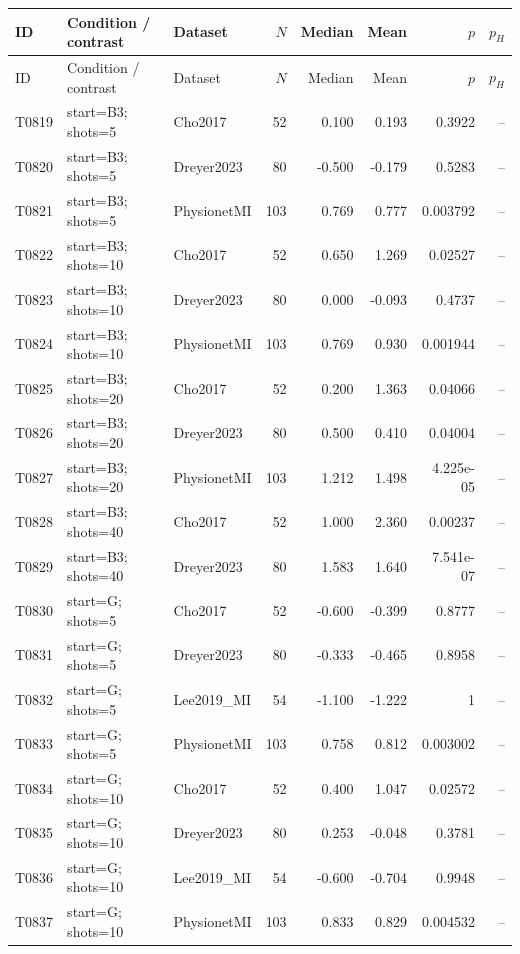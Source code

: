 \begin{longtable}{p{.45in}p{2.6in}p{.75in}rrrrr}
\toprule
ID & Condition / contrast & Dataset & $N$ & Median & Mean & $p$ & $p_H$ \\
\midrule
\endfirsthead
\toprule
ID & Condition / contrast & Dataset & $N$ & Median & Mean & $p$ & $p_H$ \\
\midrule
\endhead
T0819 & start=B3; shots=5 & Cho2017 & 52 & 0.100 & 0.193 & 0.3922 & -- \\
T0820 & start=B3; shots=5 & Dreyer2023 & 80 & -0.500 & -0.179 & 0.5283 & -- \\
T0821 & start=B3; shots=5 & PhysionetMI & 103 & 0.769 & 0.777 & 0.003792 & -- \\
T0822 & start=B3; shots=10 & Cho2017 & 52 & 0.650 & 1.269 & 0.02527 & -- \\
T0823 & start=B3; shots=10 & Dreyer2023 & 80 & 0.000 & -0.093 & 0.4737 & -- \\
T0824 & start=B3; shots=10 & PhysionetMI & 103 & 0.769 & 0.930 & 0.001944 & -- \\
T0825 & start=B3; shots=20 & Cho2017 & 52 & 0.200 & 1.363 & 0.04066 & -- \\
T0826 & start=B3; shots=20 & Dreyer2023 & 80 & 0.500 & 0.410 & 0.04004 & -- \\
T0827 & start=B3; shots=20 & PhysionetMI & 103 & 1.212 & 1.498 & 4.225e-05 & -- \\
T0828 & start=B3; shots=40 & Cho2017 & 52 & 1.000 & 2.360 & 0.00237 & -- \\
T0829 & start=B3; shots=40 & Dreyer2023 & 80 & 1.583 & 1.640 & 7.541e-07 & -- \\
T0830 & start=G; shots=5 & Cho2017 & 52 & -0.600 & -0.399 & 0.8777 & -- \\
T0831 & start=G; shots=5 & Dreyer2023 & 80 & -0.333 & -0.465 & 0.8958 & -- \\
T0832 & start=G; shots=5 & Lee2019\_\allowbreak{}MI & 54 & -1.100 & -1.222 & 1 & -- \\
T0833 & start=G; shots=5 & PhysionetMI & 103 & 0.758 & 0.812 & 0.003002 & -- \\
T0834 & start=G; shots=10 & Cho2017 & 52 & 0.400 & 1.047 & 0.02572 & -- \\
T0835 & start=G; shots=10 & Dreyer2023 & 80 & 0.253 & -0.048 & 0.3781 & -- \\
T0836 & start=G; shots=10 & Lee2019\_\allowbreak{}MI & 54 & -0.600 & -0.704 & 0.9948 & -- \\
T0837 & start=G; shots=10 & PhysionetMI & 103 & 0.833 & 0.829 & 0.004532 & -- \\

\end{longtable}
